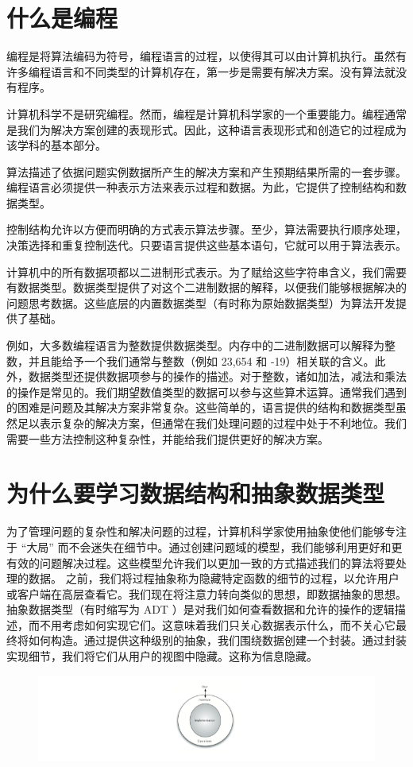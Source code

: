 \documentclass[10pt,a4paper]{article}
\begin{document}
\section{什么是编程}
        
编程是将算法编码为符号，编程语言的过程，以使得其可以由计算机执行。虽然有许多编程语言和不同类型的计算机存在，第一步是需要有解决方案。没有算法就没有程序。

计算机科学不是研究编程。然而，编程是计算机科学家的一个重要能力。编程通常是我们为解决方案创建的表现形式。因此，这种语言表现形式和创造它的过程成为该学科的基本部分。
        
算法描述了依据问题实例数据所产生的解决方案和产生预期结果所需的一套步骤。编程语言必须提供一种表示方法来表示过程和数据。为此，它提供了控制结构和数据类型。
        
控制结构允许以方便而明确的方式表示算法步骤。至少，算法需要执行顺序处理，决策选择和重复控制迭代。只要语言提供这些基本语句，它就可以用于算法表示。
        
计算机中的所有数据项都以二进制形式表示。为了赋给这些字符串含义，我们需要有数据类型。数据类型提供了对这个二进制数据的解释，以便我们能够根据解决的问题思考数据。这些底层的内置数据类型（有时称为原始数据类型）为算法开发提供了基础。
        
例如，大多数编程语言为整数提供数据类型。内存中的二进制数据可以解释为整数，并且能给予一个我们通常与整数（例如 23,654 和 -19）相关联的含义。此外，数据类型还提供数据项参与的操作的描述。对于整数，诸如加法，减法和乘法的操作是常见的。我们期望数值类型的数据可以参与这些算术运算。通常我们遇到的困难是问题及其解决方案非常复杂。这些简单的，语言提供的结构和数据类型虽然足以表示复杂的解决方案，但通常在我们处理问题的过程中处于不利地位。我们需要一些方法控制这种复杂性，并能给我们提供更好的解决方案。
        
\section{为什么要学习数据结构和抽象数据类型}

为了管理问题的复杂性和解决问题的过程，计算机科学家使用抽象使他们能够专注于 “大局” 而不会迷失在细节中。通过创建问题域的模型，我们能够利用更好和更有效的问题解决过程。这些模型允许我们以更加一致的方式描述我们的算法将要处理的数据。
之前，我们将过程抽象称为隐藏特定函数的细节的过程，以允许用户或客户端在高层查看它。我们现在将注意力转向类似的思想，即数据抽象的思想。抽象数据类型（有时缩写为 ADT ）是对我们如何查看数据和允许的操作的逻辑描述，而不用考虑如何实现它们。这意味着我们只关心数据表示什么，而不关心它最终将如何构造。通过提供这种级别的抽象，我们围绕数据创建一个封装。通过封装实现细节，我们将它们从用户的视图中隐藏。这称为信息隐藏。
\begin{figure}[htbp]
        \centering
        \includegraphics[width=6in]{images/ds_adt.png}
\end{figure}
\end{document}
